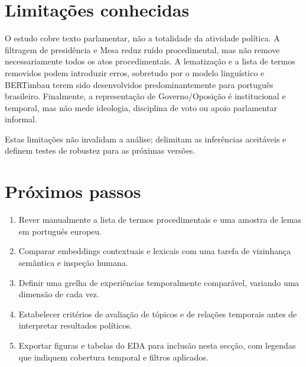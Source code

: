 \documentclass[11pt,a4paper]{article}
\begin{document}
\section{Limitações conhecidas}

O estudo cobre texto parlamentar, não a totalidade da atividade política. A filtragem de presidência e Mesa reduz ruído procedimental, mas não remove necessariamente todos os atos procedimentais. A lematização e a lista de termos removidos podem introduzir erros, sobretudo por o modelo linguístico e BERTimbau terem sido desenvolvidos predominantemente para português brasileiro. Finalmente, a representação de Governo/Oposição é institucional e temporal, mas não mede ideologia, disciplina de voto ou apoio parlamentar informal.

Estas limitações não invalidam a análise; delimitam as inferências aceitáveis e definem testes de robustez para as próximas versões.

\section{Próximos passos}

\begin{enumerate}
  \item Rever manualmente a lista de termos procedimentais e uma amostra de lemas em português europeu.
  \item Comparar embeddings contextuais e lexicais com uma tarefa de vizinhança semântica e inspeção humana.
  \item Definir uma grelha de experiências temporalmente comparável, variando uma dimensão de cada vez.
  \item Estabelecer critérios de avaliação de tópicos e de relações temporais antes de interpretar resultados políticos.
  \item Exportar figuras e tabelas do EDA para inclusão nesta secção, com legendas que indiquem cobertura temporal e filtros aplicados.
\end{enumerate}



\end{document}
